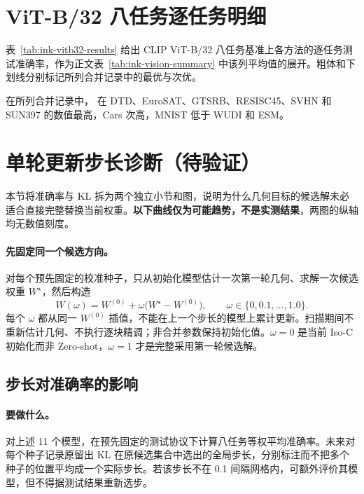 \section{ViT-B/32 八任务逐任务明细}
\label{apdx:ink-vitb32-details}

表~\ref{tab:ink-vitb32-results} 给出 CLIP ViT-B/32 八任务基准上各方法的逐任务测试准确率，作为正文表~\ref{tab:ink-vision-summary} 中该列平均值的展开。粗体和下划线分别标记所列合并记录中的最优与次优。



在所列合并记录中，\method{} 在 DTD、EuroSAT、GTSRB、RESISC45、SVHN 和 SUN397 的数值最高，Cars 次高，MNIST 低于 WUDI 和 ESM。

\FloatBarrier
\section{单轮更新步长诊断（待验证）}
\label{apdx:ink-step-size}

本节将准确率与 KL 拆为两个独立小节和图，说明为什么几何目标的候选解未必适合直接完整替换当前权重。\textbf{以下曲线仅为可能趋势，不是实测结果}，两图的纵轴均无数值刻度。

\paragraph{先固定同一个候选方向。}
对每个预先固定的校准种子，只从初始化模型估计一次第一轮几何、求解一次候选权重 $W^\star$，然后构造
\[
  W(\omega)=W^{(0)}+\omega\bigl(W^\star-W^{(0)}\bigr),\qquad
  \omega\in\{0,0.1,\ldots,1.0\}.
\]
每个 $\omega$ 都从同一 $W^{(0)}$ 插值，不能在上一个步长的模型上累计更新。扫描期间不重新估计几何、不执行逐块精调；非合并参数保持初始化值。$\omega=0$ 是当前 Iso-C 初始化而非 Zero-shot，$\omega=1$ 才是完整采用第一轮候选解。

\subsection{步长对准确率的影响}
\paragraph{要做什么。}
对上述 11 个模型，在预先固定的测试协议下计算八任务等权平均准确率。未来对每个种子记录原留出 KL 在原候选集合中选出的全局步长，分别标注而不把多个种子的位置平均成一个实际步长。若该步长不在 0.1 间隔网格内，可额外评价其模型，但不得据测试结果重新选步。



